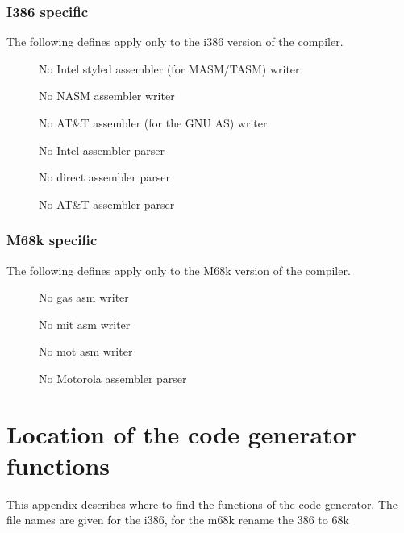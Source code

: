 \documentclass{report}
\begin{document}
\subsection{I386 specific}
The following defines apply only to the i386 version of the compiler.

\begin{description}
 \item[] No Intel styled assembler (for MASM/TASM) writer
 \item[] No NASM assembler writer
 \item[] No AT\&T assembler (for the GNU AS) writer
 \item[] No Intel assembler parser
 \item[] No direct assembler parser
 \item[] No AT\&T assembler parser
\end{description}

\subsection{M68k specific}
The following defines apply only to the M68k version of the compiler.

\begin{description}
 \item[] No gas asm writer
 \item[] No mit asm writer
 \item[] No mot asm writer
 \item[] No Motorola assembler parser
\end{description}

\chapter{Location of the code generator functions}

This appendix describes where to find the functions of
the code generator. The file names are given for the
i386, for the m68k rename the 386 to 68k
\end{document}
